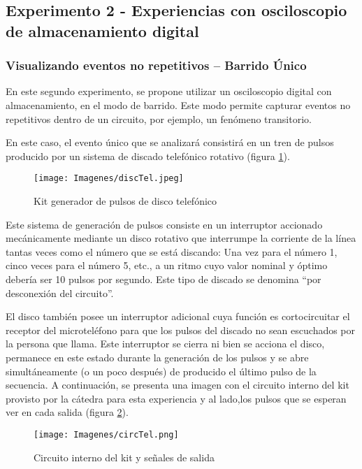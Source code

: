 \subsection{Experimento 2 - Experiencias con osciloscopio de almacenamiento digital}

\vspace{5mm}
\subsubsection{Visualizando eventos no repetitivos – Barrido Único}

En este segundo experimento, se propone utilizar un osciloscopio digital con almacenamiento, en el modo de barrido. Este modo permite capturar eventos no repetitivos dentro de un circuito, por ejemplo, un fenómeno transitorio.

En este caso, el evento único que se analizará consistirá en un tren de pulsos producido por un sistema de discado telefónico rotativo (figura \ref{disco}). 

\begin{figure}[H]
    \centering
        \texttt{[image: Imagenes/discTel.jpeg]}
    \caption{Kit generador de pulsos de disco telefónico}
    \label{disco}
\end{figure}

Este sistema de generación de pulsos consiste en un interruptor accionado mecánicamente mediante un disco rotativo que interrumpe la corriente de la línea tantas veces como el número que se está discando: Una vez para el número 1, cinco veces para el número 5, etc., a un ritmo cuyo valor nominal y óptimo debería ser 10 pulsos por segundo. Este tipo de discado se denomina “por desconexión del circuito”. 

El disco también posee un interruptor adicional cuya función es cortocircuitar el receptor del microteléfono para que los pulsos del discado no sean escuchados por la persona que llama. Este interruptor se cierra ni bien se acciona el disco, permanece en este estado durante la generación de los pulsos y se abre simultáneamente (o un poco después) de producido el último pulso de la secuencia. 
A continuación, se presenta una imagen con el circuito interno del kit provisto por la cátedra para esta experiencia y al lado,los pulsos que se esperan ver en cada salida (figura \ref{circTel}).

\begin{figure}[H]
    \centering
        \texttt{[image: Imagenes/circTel.png]}
    \caption{Circuito interno del kit y señales de salida}
    \label{circTel}
\end{figure}

